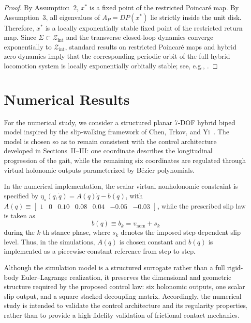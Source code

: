 \documentclass[letterpaper, 10 pt, conference]{ieeeconf}
\begin{document}
{\begin{proof}
By Assumption~2, $x^\ast$ is a fixed point of the restricted Poincaré map. By Assumption~3, all eigenvalues of $A_P=DP(x^\ast)$ lie strictly inside the unit disk. Therefore, $x^\ast$ is a locally exponentially stable fixed point of the restricted return map. Since $\Sigma\subset \mathcal Z_{\mathrm{int}}$ and the transverse closed-loop dynamics converge exponentially to $\mathcal Z_{\mathrm{int}}$, standard results on restricted Poincaré maps and hybrid zero dynamics imply that the corresponding periodic orbit of the full hybrid locomotion system is locally exponentially orbitally stable; see, e.g., \cite{morris2005restricted, Westervelt2007}.
\end{proof}


\section{Numerical Results}

For the numerical study, we consider a structured planar 7-DOF hybrid biped model inspired by the slip-walking framework of Chen, Trkov, and Yi~\cite{chen2017hybrid,TrkovChenYi2019}. The model is chosen so as to remain consistent with the control architecture developed in Sections~II--III: one coordinate describes the longitudinal progression of the gait, while the remaining six coordinates are regulated through virtual holonomic outputs parameterized by B\'ezier polynomials. 

In the numerical implementation, the scalar virtual  nonholonomic constraint is specified by $\eta_s(q,\dot q)=A(q)\dot q-b(q)$, with 
$A(q)\equiv
\begin{bmatrix}
1 & 0 & 0.10 & 0.08 & 0.04 & -0.05 & -0.03
\end{bmatrix}$, while the prescribed slip law is taken as $$b(q)\equiv b_k=v_{\mathrm{nom}}+s_k$$ during the $k$-th stance phase, where $s_k$ denotes the imposed step-dependent slip level. Thus, in the simulations, $A(q)$ is chosen constant and $b(q)$ is implemented as a piecewise-constant reference from step to step. 

Although the simulation model is a structured surrogate rather than a full rigid-body Euler--Lagrange realization, it preserves the dimensional and geometric structure required by the proposed control law: six holonomic outputs, one scalar slip output, and a square stacked decoupling matrix. Accordingly, the numerical study is intended to validate the control
architecture and its regularity properties, rather than to provide a
high-fidelity validation of frictional contact mechanics.

}
\end{document}
